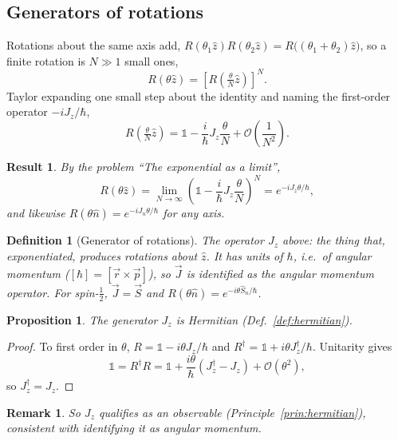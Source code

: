 \documentclass{article}
\newtheorem{definition}{Definition}
\newtheorem{remark}{Remark}
\newtheorem{proposition}{Proposition}
\newtheorem{result}{Result}
\newcommand{\id}{\mathds{1}}
\begin{document}
\subsection{Generators of rotations}
\label{sec:generators}
Rotations about the same axis add, $R(\theta_1\hat{z})R(\theta_2\hat{z}) = R\big((\theta_1+\theta_2)\hat{z}\big)$, so a finite rotation is $N \gg 1$ small ones,
\begin{equation}
    R(\theta\hat{z}) = \left[R\left(\tfrac{\theta}{N}\hat{z}\right)\right]^{N}.
\end{equation}
Taylor expanding one small step about the identity and naming the first-order operator $-iJ_z/\hbar$,
\begin{equation}
    R\left(\tfrac{\theta}{N}\hat{z}\right) = \id - \frac{i}{\hbar}J_z\frac{\theta}{N} + \mathcal{O}\!\left(\frac{1}{N^2}\right).
\end{equation}
\begin{result}
    By the problem ``The exponential as a limit'',
    \begin{equation}
        R(\theta\hat{z}) = \lim_{N\to\infty}\left(\id - \frac{i}{\hbar}J_z\frac{\theta}{N}\right)^{N} = e^{-iJ_z\theta/\hbar},
    \end{equation}
    and likewise $R(\theta\hat{n}) = e^{-iJ_n\theta/\hbar}$ for any axis.
\end{result}
\begin{definition}[Generator of rotations]
    The operator $J_z$ above: the thing that, exponentiated, produces rotations about $\hat{z}$. It has units of $\hbar$, i.e.\ of angular momentum ($[\hbar] = [\vec{r}\times\vec{p}]$), so $\vec{J}$ is identified as the angular momentum operator. For spin-$\tfrac12$, $\vec{J} = \vec{S}$ and $R(\theta\hat{n}) = e^{-i\theta\hat{S}_n/\hbar}$.
\end{definition}
\begin{proposition}
    The generator $J_z$ is Hermitian (Def.~\ref{def:hermitian}).
\end{proposition}
\begin{proof}
    To first order in $\theta$, $R = \id - i\theta J_z/\hbar$ and $R^\dagger = \id + i\theta J_z^\dagger/\hbar$. Unitarity gives
    \[\id = R^\dagger R = \id + \frac{i\theta}{\hbar}\left(J_z^\dagger - J_z\right) + \mathcal{O}(\theta^2),\]
    so $J_z^\dagger = J_z$.
\end{proof}
\begin{remark}
    So $J_z$ qualifies as an observable (Principle~\ref{prin:hermitian}), consistent with identifying it as angular momentum.
\end{remark}
\end{document}
